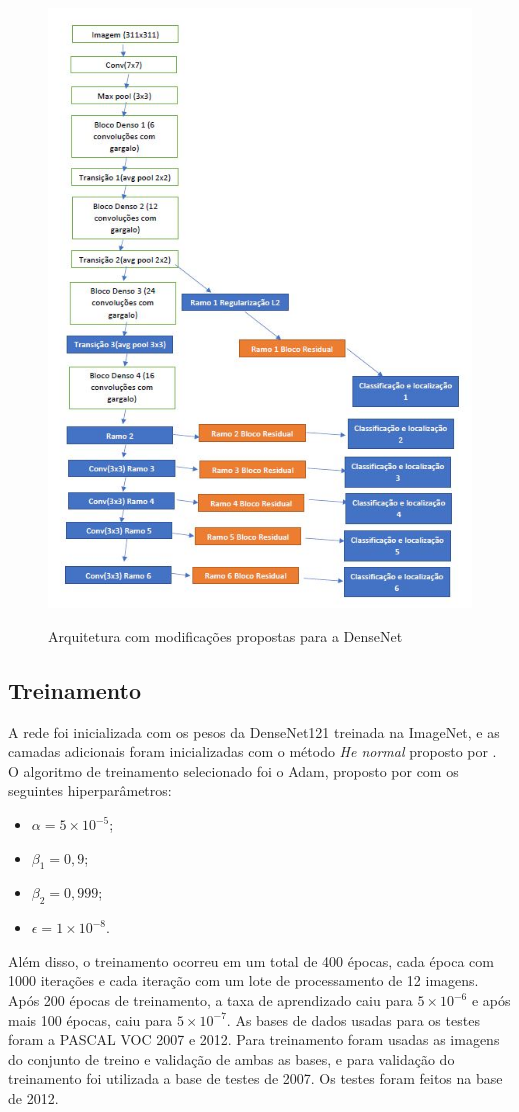\begin{figure}[H]
	\setlength{\abovecaptionskip}{0pt}
	\setlength{\belowcaptionskip}{0pt}
	\caption[Arquitetura proposta]{Arquitetura com modificações propostas para a \ac{DenseNet}}
	\centering
	\includegraphics[width=.6\textwidth]{imagem/0x_densenet_classloc.jpg}
	\captionsetup{justification=centering}
	\label{fig:dense_ssd}
\end{figure}


\subsection{Treinamento}
\label{secao:4:3:2}

A rede foi inicializada com os pesos da \ac{DenseNet}121 treinada na ImageNet, e as camadas adicionais foram inicializadas com o método \textit{He normal} proposto por . O algoritmo de treinamento selecionado foi o Adam, proposto por  com os seguintes hiperparâmetros:

\begin{itemize}
	\item $\alpha = 5\times10^{-5}$;
	\item $\beta_1 = 0,9$;
	\item $\beta_2 = 0,999$;
	\item $\epsilon = 1\times10^{-8}$.
\end{itemize}

Além disso, o treinamento ocorreu em um total de 400 épocas, cada época com 1000 iterações e cada iteração com um lote de processamento de 12 imagens. Após 200 épocas de treinamento, a taxa de aprendizado caiu para $5\times10^{-6}$ e após mais 100 épocas, caiu para $5\times10^{-7}$. As bases de dados usadas para os testes foram a \ac{PASCAL VOC} 2007 e 2012. Para treinamento foram usadas as imagens do conjunto de treino e validação de ambas as bases, e para validação do treinamento foi utilizada a base de testes de 2007. Os testes foram feitos na base de 2012.